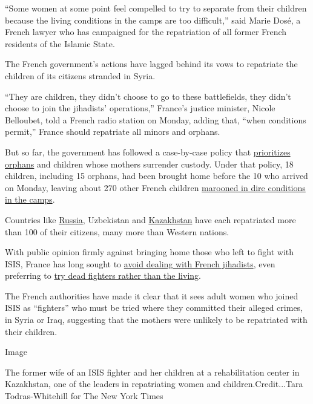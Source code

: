 ``Some women at some point feel compelled to try to separate from their
children because the living conditions in the camps are too difficult,''
said Marie Dosé, a French lawyer who has campaigned for the repatriation
of all former French residents of the Islamic State.

The French government's actions have lagged behind its vows to
repatriate the children of its citizens stranded in Syria.

``They are children, they didn't choose to go to these battlefields,
they didn't choose to join the jihadists' operations,'' France's justice
minister, Nicole Belloubet, told a French radio station on Monday,
adding that, ``when conditions permit,'' France should repatriate all
minors and orphans.

But so far, the government has followed a case-by-case policy that
\href{https://www.nytimes3xbfgragh.onion/2019/03/15/world/europe/france-isis-repatriates-children.html}{prioritizes
orphans} and children whose mothers surrender custody. Under that
policy, 18 children, including 15 orphans, had been brought home before
the 10 who arrived on Monday, leaving about 270 other French children
\href{https://www.nytimes3xbfgragh.onion/2019/05/08/world/middleeast/isis-prisoners-children-women.html}{marooned
in dire conditions in the camps}.

Countries like
\href{https://www.nytimes3xbfgragh.onion/2018/02/24/world/europe/chechnya-russia-isis-children-return.html}{Russia},
Uzbekistan and
\href{https://www.nytimes3xbfgragh.onion/2019/08/10/world/europe/kazakhstan-women-islamic-state-deradicalization.html}{Kazakhstan}
have each repatriated more than 100 of their citizens, many more than
Western nations.

With public opinion firmly against bringing home those who left to fight
with ISIS, France has long sought to
\href{https://www.nytimes3xbfgragh.onion/2019/11/17/world/europe/turkey-isis-fighters-europe.html}{avoid
dealing with French jihadists}, even preferring to
\href{https://www.nytimes3xbfgragh.onion/2020/01/26/world/europe/france-ghost-trials-isis.html}{try
dead fighters rather than the living}.

The French authorities have made it clear that it sees adult women who
joined ISIS as ``fighters'' who must be tried where they committed their
alleged crimes, in Syria or Iraq, suggesting that the mothers were
unlikely to be repatriated with their children.

Image

The former wife of an ISIS fighter and her children at a rehabilitation
center in Kazakhstan, one of the leaders in repatriating women and
children.Credit...Tara Todras-Whitehill for The New York Times

